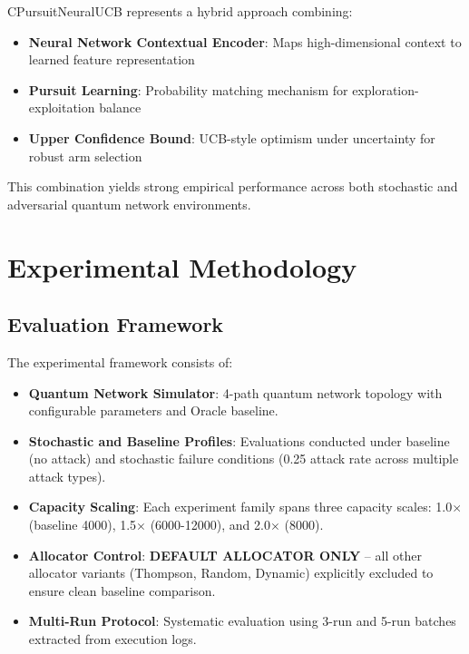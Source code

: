 \documentclass[12pt,a4paper]{article}
\begin{document}
CPursuitNeuralUCB represents a hybrid approach combining:

\begin{itemize}
    \item \textbf{Neural Network Contextual Encoder}: Maps high-dimensional context to learned feature representation
    \item \textbf{Pursuit Learning}: Probability matching mechanism for exploration-exploitation balance
    \item \textbf{Upper Confidence Bound}: UCB-style optimism under uncertainty for robust arm selection
\end{itemize}

This combination yields strong empirical performance across both stochastic and adversarial quantum network environments.

\section{Experimental Methodology}

\subsection{Evaluation Framework}

The experimental framework consists of:

\begin{itemize}
    \item \textbf{Quantum Network Simulator}: 4-path quantum network topology with configurable parameters and Oracle baseline.
    
    \item \textbf{Stochastic and Baseline Profiles}: Evaluations conducted under baseline (no attack) and stochastic failure conditions (0.25 attack rate across multiple attack types).
    
    \item \textbf{Capacity Scaling}: Each experiment family spans three capacity scales: 1.0$\times$ (baseline 4000), 1.5$\times$ (6000-12000), and 2.0$\times$ (8000).
    
    \item \textbf{Allocator Control}: \textbf{DEFAULT ALLOCATOR ONLY} -- all other allocator variants (Thompson, Random, Dynamic) explicitly excluded to ensure clean baseline comparison.
    
    \item \textbf{Multi-Run Protocol}: Systematic evaluation using 3-run and 5-run batches extracted from execution logs.
\end{itemize}
\end{document}
